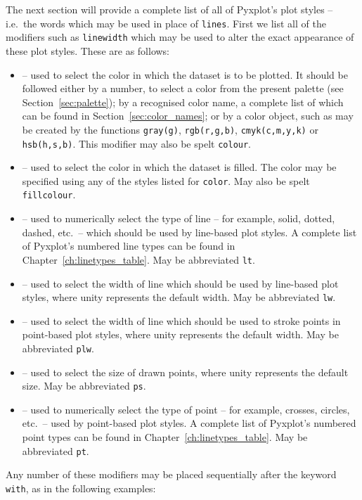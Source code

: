 The next section will provide a complete list of all of Pyxplot's plot styles
-- i.e.\ the words which may be used in place of {\tt lines}. First we list all
of the modifiers such as {\tt line\-width} which may be used to alter the exact
appearance of these plot styles. These are as follows:

\begin{itemize}
\item {} -- used to select the color in which the dataset is to be plotted. It should be followed either by a number, to select a color from the present palette (see Section~\ref{sec:palette}); by a recognised color name, a complete list of which can be found in Section~\ref{sec:color_names}; or by a color object, such as may be created by the functions {\tt gray(g)}, {\tt rgb(r,g,b)}, {\tt cmyk(c,m,y,k)} or {\tt hsb(h,s,b)}. This modifier may also be spelt {\tt colour}.
\item {} -- used to select the color in which the dataset is filled. The color may be specified using any of the styles listed for {\tt color}. May also be spelt {\tt fillcolour}.
\item {} -- used to numerically select the type of line -- for example, solid, dotted, dashed, etc.\ -- which should be used by line-based plot styles. A complete list of Pyxplot's numbered line types can be found in Chapter~\ref{ch:linetypes_table}. May be abbreviated {\tt lt}.
\item {} -- used to select the width of line which should be used by line-based plot styles, where unity represents the default width. May be abbreviated {\tt lw}.
\item {} -- used to select the width of line which should be used to stroke points in point-based plot styles, where unity represents the default width. May be abbreviated {\tt plw}.
\item {} -- used to select the size of drawn points, where unity represents the default size. May be abbreviated {\tt ps}.
\item {} -- used to numerically select the type of point -- for example, crosses, circles, etc.\ -- used by point-based plot styles. A complete list of Pyxplot's numbered point types can be found in Chapter~\ref{ch:linetypes_table}. May be abbreviated {\tt pt}.
\end{itemize}

Any number of these modifiers may be placed sequentially after the keyword {\tt
with}, as in the following examples:

